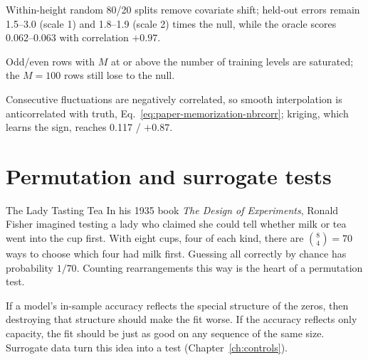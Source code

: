 \begin{keyideas}
\item Within-height random 80/20 splits remove covariate shift; held-out errors remain 1.5--3.0 (scale 1) and 1.8--1.9 (scale 2) times the null, while the oracle scores 0.062--0.063 with correlation $+0.97$.
\item Odd/even rows with $M$ at or above the number of training levels are saturated; the $M=100$ rows still lose to the null.
\item Consecutive fluctuations are negatively correlated, so smooth interpolation is anticorrelated with truth, Eq.~\eqref{eq:paper-memorization-nbrcorr}; kriging, which learns the sign, reaches 0.117 / $+0.87$.
\end{keyideas}

\section{Permutation and surrogate tests}\label{sec:paper-memorization-surrogates}
\begin{didyouknow}{The Lady Tasting Tea}
In his 1935 book \emph{The Design of Experiments}, Ronald Fisher imagined testing a lady who claimed she could tell whether milk or tea went into the cup first. With eight cups, four of each kind, there are $\binom84=70$ ways to choose which four had milk first. Guessing all correctly by chance has probability $1/70$. Counting rearrangements this way is the heart of a permutation test.
\end{didyouknow}

If a model's in-sample accuracy reflects the special structure of the zeros, then destroying that structure should make the fit worse. If the accuracy reflects only capacity, the fit should be just as good on any sequence of the same size. Surrogate data turn this idea into a test (Chapter~\ref{ch:controls}).

